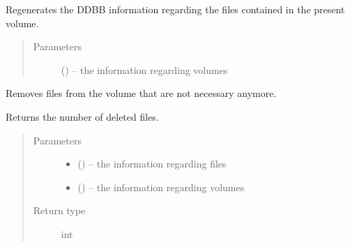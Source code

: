 \documentclass[letterpaper,10pt,english]{sphinxmanual}
\begin{document}
\begin{fulllineitems}
\label{\detokenize{index:fsbackup.commands.extractVolumeInfo}}
Regenerates the DDBB information regarding the files contained in the present volume.
\begin{quote}\begin{description}
\item[{Parameters}] \leavevmode
{} ({\hyperref[\detokenize{index:fsbackup.hashVolume.HashVolume}]{}}) -- the information regarding volumes

\end{description}\end{quote}

\end{fulllineitems}


\begin{fulllineitems}
\label{\detokenize{index:fsbackup.commands.cleanVolume}}
Removes files from the volume that are not necessary anymore.

Returns the number of deleted files.
\begin{quote}\begin{description}
\item[{Parameters}] \leavevmode\begin{itemize}
\item {} 
 ({\hyperref[\detokenize{index:fsbackup.fileDB.FileDB}]{}}) -- the information regarding files

\item {} 
 ({\hyperref[\detokenize{index:fsbackup.hashVolume.HashVolume}]{}}) -- the information regarding volumes

\end{itemize}

\item[{Return type}] \leavevmode
int

\end{description}\end{quote}

\end{fulllineitems}
\end{document}
